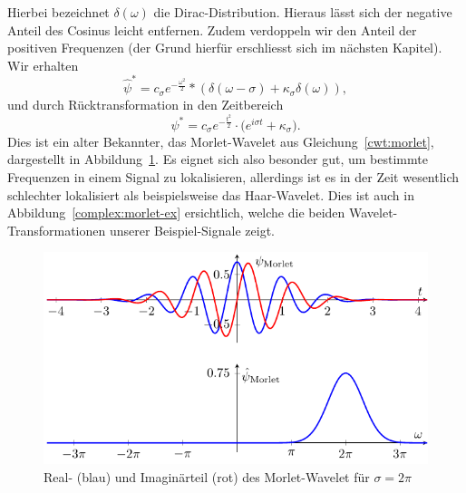 Hierbei bezeichnet $\delta(\omega)$ die Dirac-Distribution.
Hieraus lässt sich der negative Anteil des Cosinus leicht entfernen.
Zudem verdoppeln wir den Anteil der positiven Frequenzen (der Grund hierfür erschliesst sich im nächsten Kapitel).
Wir erhalten
\[
	\hat{\psi}^\ast = 
	c_\sigma e^{- \frac{\omega^2}{2}} * \left(
	\delta(\omega - \sigma) +
	\kappa_\sigma\delta(\omega)
	\right),
\]
und durch Rücktransformation in den Zeitbereich
\[
	\psi^\ast = 
	c_\sigma e^{- \frac{t^2}{2}} \cdot \bigl(
	e^{i\sigma t} +
	\kappa_\sigma
	\bigr).
\]
Dies ist ein alter Bekannter, das Morlet-Wavelet aus Gleichung~\eqref{cwt:morlet}, dargestellt in Abbildung~\ref{complex:morlet}.
Es eignet sich also besonder gut, um bestimmte Frequenzen in einem Signal zu lokalisieren, allerdings ist es in der Zeit wesentlich schlechter lokalisiert als beispielsweise das Haar-Wavelet.
Dies ist auch in Abbildung~\ref{complex:morlet-ex} ersichtlich, welche die beiden Wavelet-Transformationen unserer Beispiel-Signale zeigt.

\begin{figure}
	\centering
	\includegraphics{papers/complex/images/morlet.pdf}
	\caption{Real- (blau) und Imaginärteil (rot) des Morlet-Wavelet für $\sigma = 2\pi$ \label{complex:morlet}}
\end{figure}

